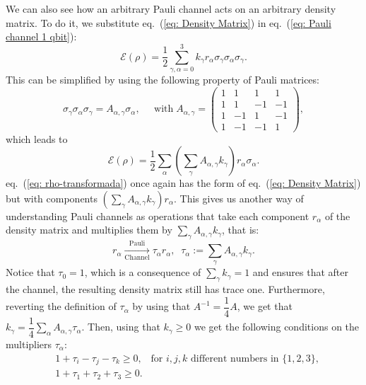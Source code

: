 \documentclass[10pt,letterpaper]{article} %
\newcommand{\eref}[1]{eq.~(\ref{#1})}
\begin{document}
We can also see how an arbitrary Pauli channel acts on an arbitrary  
density matrix.
To do it, we substitute \eref{eq: Density Matrix} 
in \eref{eq: Pauli channel 1 qbit}:
\begin{equation}
\mathcal{E}(\rho) = \dfrac{1}{2}\sum_{\gamma,\alpha=0}^3 k_{\gamma} r_{\alpha} \sigma_{\gamma} \sigma_{\alpha} \sigma_{\gamma}.
\end{equation}
This can be simplified by using the following property of Pauli matrices:
\begin{equation}
\label{eq: propiedad-pauli}
\sigma_{\gamma} \sigma_{\alpha} \sigma_{\gamma} = A_{\alpha,\gamma} \sigma_{\alpha}, \;\;\;\;\; \text{with} \; A_{\alpha,\gamma} = \begin{pmatrix}
1 & 1 & 1 & 1\\
1 & 1 & -1 &-1 \\
1 & -1 & 1 & -1 \\
1 & -1 & -1 & 1
\end{pmatrix},
\end{equation}
which leads to
\begin{equation}
\label{eq: rho-transformada}
\mathcal{E}(\rho) = \dfrac{1}{2} \sum_{\alpha} \left(\sum_{\gamma} A_{\alpha, \gamma} k_{\gamma} \right) r_{\alpha} \sigma_{\alpha}.
\end{equation}
\eref{eq: rho-transformada} once again has the form of \eref{eq: Density Matrix}
but with components $\left( \sum_{\gamma} A_{\alpha,\gamma} k_{\gamma} \right) r_{\alpha}$.
This gives us another way of understanding Pauli channels
as operations that take each component $r_{\alpha}$
of the density matrix and multiplies them
by $\sum_{\gamma} A_{\alpha,\gamma} k_{\gamma}$, 
that is:
\begin{equation}
\label{eq: multipliers}
r_{\alpha}  \xrightarrow[\text{Channel}]{\text{Pauli}}  \tau_{\alpha} r_{\alpha} ,\;\; \tau_{\alpha} := \sum_{\gamma} A_{\alpha,\gamma} k_{\gamma}.
\end{equation}
Notice that $\tau_0 = 1$, which is a consequence of $\sum_{\gamma}k_{\gamma}=1$
and ensures that after the channel, the resulting density matrix still has trace one. 
Furthermore, reverting the definition of $\tau_{\alpha}$ by using that $A^{-1} = \dfrac{1}{4} A$, 
we get that $k_{\gamma} = \dfrac{1}{4} \sum_{\alpha} A_{\alpha,\gamma} \tau_{\alpha}$.
Then, using that $k_{\gamma} \geq 0$
we get the following conditions on the multipliers $\tau_{\alpha}$:
\begin{eqnarray}
\label{eq: conditions-tetrahedron}
&1+\tau_i -\tau_j - \tau_k \geq 0,  \;\;\; \text{for $i,j,k$ different numbers in $\{1,2,3\}$}, \\
&1+\tau_1 + \tau_2 + \tau_3 \geq 0.
\end{eqnarray}
\end{document}
